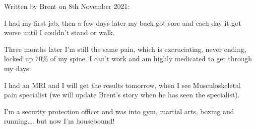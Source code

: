 Written by Brent on 8th November 2021:

I had my first jab, then a few days later my back got sore and each day it got
worse until I couldn’t stand or walk.

Three months later I’m still the same pain, which is excruciating, never ending,
locked up 70\% of my spine. I can’t work and am highly medicated to get through
my days.

I had an MRI and I will get the results tomorrow, when I see Musculoskeletal
pain specialist (we will update Brent’s story when he has seen the specialist).

I’m a security protection officer and was into gym, martial arts, boxing and
running…. but now I’m housebound!
